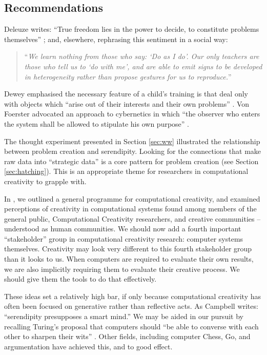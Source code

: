 \subsection{Recommendations} \label{sec:recommendations}

%
Deleuze writes: ``True freedom lies in the power to decide, to
constitute problems themselves'' \cite[p. 15]{deleuze1991bergsonism};
and, elsewhere, rephrasing this sentiment in a social way:
\begin{quote}
``\emph{We learn nothing from those who say: `Do as I do'. Our only teachers
  are those who tell us to `do with me', and are able to emit signs to
  be developed in heterogeneity rather than propose gestures for us to
  reproduce.}''~\cite[p. 26]{deleuze1994difference}
\end{quote}
Dewey emphasised the necessary feature of a child's training is that
deal only with objects which ``arise out of their interests and their
own problems'' \cite[p. 73]{dewey-by-mead}.  Von Foerster advocated an
approach to cybernetics in which ``the observer who enters the system
shall be allowed to stipulate his own purpose''
\cite[p. 286]{von2003essays}.

The thought experiment presented in Section \ref{sec:ww} illustrated
the relationship between problem creation and serendipity.  Looking
for the connections that make raw data into ``strategic data'' is a
core pattern for problem creation (see Section \ref{sec:hatching}).
This is an appropriate theme for researchers in computational
creativity to grapple with.

In \cite{stakeholder-groups-bookchapter}, we outlined a general
programme for computational creativity, and examined perceptions of
creativity in computational systems found among members of the general
public, Computational Creativity researchers, and creative communities
-- understood as human communities.  We should now add a fourth
important ``stakeholder'' group in computational creativity research:
computer systems themselves.  Creativity may look very different to
this fourth stakeholder group than it looks to us.  When computers are
required to evaluate their own results, we are also implicitly
requiring them to evaluate their creative process.  We should give
them the tools to do that effectively.

These ideas set a relatively high bar, if only because computational
creativity has often been focused on generative rather than reflective
acts.  As Campbell \citeyear{campbell} writes: ``serendipity
presupposes a smart mind.''  We may be aided in our pursuit by
recalling Turing's proposal that computers should ``be able to
converse with each other to sharpen their wits''
\cite{turing-intelligent}.  Other fields, including computer Chess,
Go, and argumentation have achieved this, and to good effect.

